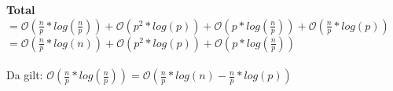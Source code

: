 \textbf{Total} $= \mathcal{O}(\frac{n}{p}*log(\frac{n}{p}))+\mathcal{O}(p^2 * log(p)) + \mathcal{O}(p * log(\frac{n}{p})) + \mathcal{O}(\frac{n}{p} * log(p))$ \\
$= \mathcal{O}(\frac{n}{p}*log(n)) + \mathcal{O}(p^2*log(p)) + \mathcal{O}(p*log(\frac{n}{p}))$\\ \\ 
Da gilt: $\mathcal{O}(\frac{n}{p}*log (\frac{n}{p})) = \mathcal{O}(\frac{n}{p}*log(n) - \frac{n}{p}*log(p))$